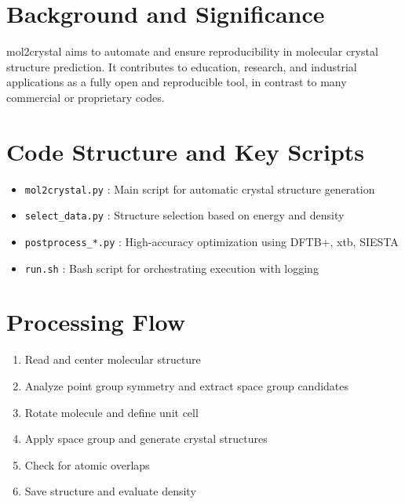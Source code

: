 \documentclass[12pt]{article}
\begin{document}
\section{Background and Significance}
mol2crystal aims to automate and ensure reproducibility in molecular crystal structure prediction. It contributes to education, research, and industrial applications as a fully open and reproducible tool, in contrast to many commercial or proprietary codes.

\section{Code Structure and Key Scripts}
\begin{itemize}
    \item \texttt{mol2crystal.py} : Main script for automatic crystal structure generation
    \item \texttt{select\_data.py} : Structure selection based on energy and density
    \item \texttt{postprocess\_*.py} : High-accuracy optimization using DFTB+, xtb, SIESTA
    \item \texttt{run.sh} : Bash script for orchestrating execution with logging
\end{itemize}

\section{Processing Flow}
\begin{enumerate}
    \item Read and center molecular structure
    \item Analyze point group symmetry and extract space group candidates
    \item Rotate molecule and define unit cell
    \item Apply space group and generate crystal structures
    \item Check for atomic overlaps
    \item Save structure and evaluate density
\end{enumerate}
\end{document}
